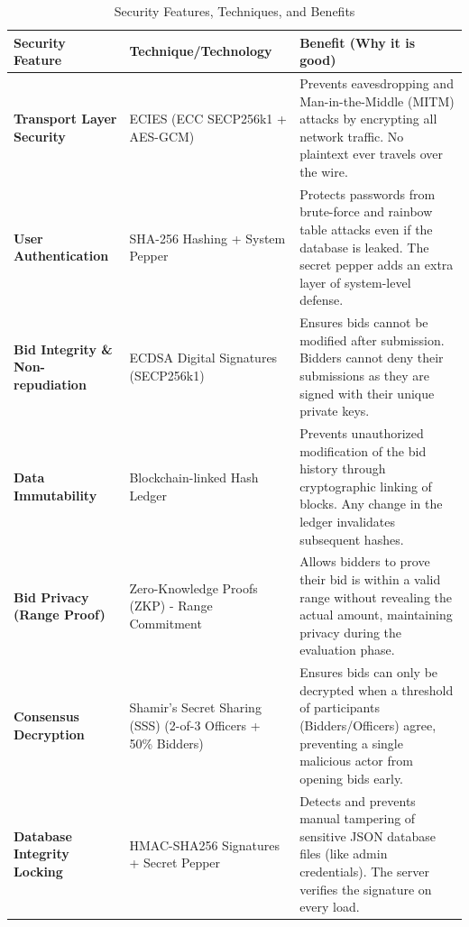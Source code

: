\documentclass[12pt,a4paper]{article}
\begin{document}
\begin{longtable}{>{\raggedright\arraybackslash}p{} >{\raggedright\arraybackslash}p{} >{\raggedright\arraybackslash}p{}}
\caption{Security Features, Techniques, and Benefits} \\
\toprule
\textbf{Security Feature} & \textbf{Technique/Technology} & \textbf{Benefit (Why it is good)} \\
\midrule
\endhead

\bottomrule
\endfoot

\textbf{Transport Layer Security} & ECIES (ECC SECP256k1 + AES-GCM) & Prevents eavesdropping and Man-in-the-Middle (MITM) attacks by encrypting all network traffic. No plaintext ever travels over the wire. \\ \midrule

\textbf{User Authentication} & SHA-256 Hashing + System Pepper & Protects passwords from brute-force and rainbow table attacks even if the database is leaked. The secret pepper adds an extra layer of system-level defense. \\ \midrule

\textbf{Bid Integrity \& Non-repudiation} & ECDSA Digital Signatures (SECP256k1) & Ensures bids cannot be modified after submission. Bidders cannot deny their submissions as they are signed with their unique private keys. \\ \midrule

\textbf{Data Immutability} & Blockchain-linked Hash Ledger & Prevents unauthorized modification of the bid history through cryptographic linking of blocks. Any change in the ledger invalidates subsequent hashes. \\ \midrule

\textbf{Bid Privacy (Range Proof)} & Zero-Knowledge Proofs (ZKP) - Range Commitment & Allows bidders to prove their bid is within a valid range without revealing the actual amount, maintaining privacy during the evaluation phase. \\ \midrule

\textbf{Consensus Decryption} & Shamir's Secret Sharing (SSS) (2-of-3 Officers + 50\% Bidders) & Ensures bids can only be decrypted when a threshold of participants (Bidders/Officers) agree, preventing a single malicious actor from opening bids early. \\ \midrule

\textbf{Database Integrity Locking} & HMAC-SHA256 Signatures + Secret Pepper & Detects and prevents manual tampering of sensitive JSON database files (like admin credentials). The server verifies the signature on every load. \\ \midrule


\end{longtable}
\end{document}
